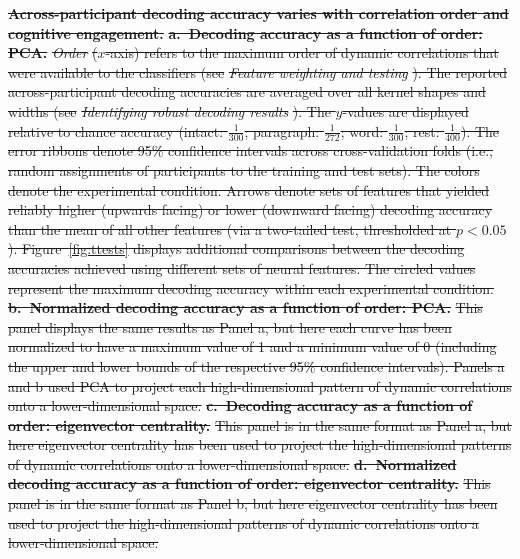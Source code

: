 \documentclass[english]{article}
\providecommand{\DIFdeltex}[1]{{\protect\color{red}\sout{#1}}}                      %
\providecommand{\DIFdelFL}[1]{\DIFdel{#1}} %
\providecommand{\DIFdel}[1]{\texorpdfstring{\DIFdeltex{#1}}{}} %
\begin{document}
{%
\textbf{\DIFdelFL{Across-participant decoding accuracy varies with
      correlation order and cognitive engagement.}}
\textbf{\DIFdelFL{a.~Decoding accuracy as a function of order: PCA.}}
\textit{\DIFdelFL{Order}} %
\DIFdelFL{($x$-axis) refers to the maximum order of dynamic
    correlations that were available to the classifiers (see
    }\textit{\DIFdelFL{Feature weighting and testing}}%
\DIFdelFL{).  The reported
    across-participant decoding accuracies are averaged over all
    kernel shapes and widths (see }\textit{\DIFdelFL{Identifying robust decoding
      results}}%
\DIFdelFL{).  The $y$-values are displayed relative to chance
    accuracy (intact: $\frac{1}{300}$; paragraph: $\frac{1}{272}$;
    word: $\frac{1}{300}$; rest: $\frac{1}{400}$).  The error ribbons
    denote 95\% confidence intervals across cross-validation folds
    (i.e., random assignments of participants to the training and test
    sets).  The colors denote the experimental condition.  Arrows
    denote sets of features that yielded reliably higher (upwards
    facing) or lower (downward facing) decoding accuracy than the mean
    of all other features (via a two-tailed test, thresholded at
    $p < 0.05$).  Figure~\ref{fig:ttests} displays additional
    comparisons between the decoding accuracies achieved using
    different sets of neural features.  The circled values represent
    the maximum decoding accuracy within each experimental condition.
    }\textbf{\DIFdelFL{b.~Normalized decoding accuracy as a function of order:
      PCA.}}  %
\DIFdelFL{This panel displays the same results as Panel a, but here
    each curve has been normalized to have a maximum value of 1 and a
    minimum value of 0 (including the upper and lower bounds of the
    respective 95\% confidence intervals).  Panels a and b used PCA to
    project each high-dimensional pattern of dynamic correlations onto
    a lower-dimensional space.  }\textbf{\DIFdelFL{c.~Decoding accuracy as a
      function of order: eigenvector centrality.}} %
\DIFdelFL{This panel is in the
    same format as Panel a, but here eigenvector centrality has been
    used to project the high-dimensional patterns of dynamic
    correlations onto a lower-dimensional space.
    }\textbf{\DIFdelFL{d.~Normalized decoding accuracy as a function of order:
      eigenvector centrality.}} %
\DIFdelFL{This panel is in the same format as
    Panel b, but here eigenvector centrality has been used to project
    the high-dimensional patterns of dynamic correlations onto a
    lower-dimensional space.}}
\end{document}
